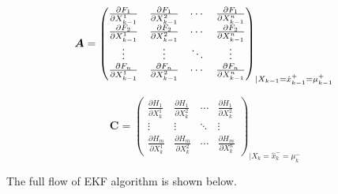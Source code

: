 \documentclass[conference]{IEEEtran}
\begin{document}
	\begin{equation}
	\boldsymbol{A}=\begin{pmatrix}
	\frac{\partial F_{1}}{\partial X_{k-1}^{1}} &\frac{\partial F_{1}}{\partial X_{k-1}^{2}}  &\cdots   &\frac{\partial F_{1}}{\partial X_{k-1}^{n}} \\ 
	\frac{\partial F_{2}}{\partial X_{k-1}^{1}} &\frac{\partial F_{2}}{\partial X_{k-1}^{2}}  &\cdots   &\frac{\partial F_{2}}{\partial X_{k-1}^{n}} \\ 
	\vdots  &\vdots   &\ddots   &\vdots  \\ 
	\frac{\partial F_{n}}{\partial X_{k-1}^{1}} &\frac{\partial F_{n}}{\partial X_{k-1}^{2}}  &\cdots   & \frac{\partial F_{n}}{\partial X_{k-1}^{n}}
	\end{pmatrix}_{\mid X_{k-1}=\hat{x}_{k-1}^{+}=\mu_{k-1}^{+}}\\
	\label{eq16}
	\end{equation}
	
	\begin{equation}
	\boldsymbol{C}=\begin{pmatrix}
	\frac{\partial H_{1}}{\partial X_{k}^{1}} &\frac{\partial H_{1}}{\partial X_{k}^{2}}  &\cdots   &\frac{\partial H_{1}}{\partial X_{k}^{2}} \\ 
	\vdots  &\vdots   &\ddots   &\vdots  \\ 
	\frac{\partial H_{m}}{\partial X_{k}^{1}} &\frac{\partial H_{m}}{\partial X_{k}^{2}}  &\cdots   &\frac{\partial H_{m}}{\partial X_{k}^{n}} 
	\end{pmatrix}_{\mid X_{k}=\hat{x}_{k}^{-}=\mu_{k}^{-}} 
	\label{eq17}
	\end{equation}
	
	
	
	The full flow of EKF algorithm is shown below.
	
\end{document}
